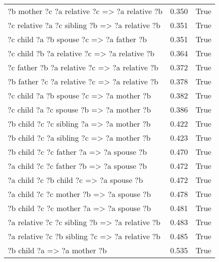 \begin{longtable}{lrl}
  ?b  mother  ?c  ?a  relative  ?c   => ?a  relative  ?b &           0.350 &                     True \\
 ?c  relative  ?a  ?c  sibling  ?b   => ?a  relative  ?b &           0.351 &                     True \\
       ?c  child  ?a  ?b  spouse  ?c   => ?a  father  ?b &           0.351 &                     True \\
   ?c  child  ?b  ?a  relative  ?c   => ?a  relative  ?b &           0.364 &                     True \\
  ?c  father  ?b  ?a  relative  ?c   => ?a  relative  ?b &           0.372 &                     True \\
  ?b  father  ?c  ?a  relative  ?c   => ?a  relative  ?b &           0.378 &                     True \\
       ?c  child  ?a  ?b  spouse  ?c   => ?a  mother  ?b &           0.382 &                     True \\
       ?c  child  ?a  ?c  spouse  ?b   => ?a  mother  ?b &           0.386 &                     True \\
      ?b  child  ?c  ?c  sibling  ?a   => ?a  mother  ?b &           0.422 &                     True \\
      ?b  child  ?c  ?a  sibling  ?c   => ?a  mother  ?b &           0.423 &                     True \\
       ?b  child  ?c  ?c  father  ?a   => ?a  spouse  ?b &           0.470 &                     True \\
       ?a  child  ?c  ?c  father  ?b   => ?a  spouse  ?b &           0.472 &                     True \\
        ?a  child  ?c  ?b  child  ?c   => ?a  spouse  ?b &           0.472 &                     True \\
       ?a  child  ?c  ?c  mother  ?b   => ?a  spouse  ?b &           0.478 &                     True \\
       ?b  child  ?c  ?c  mother  ?a   => ?a  spouse  ?b &           0.481 &                     True \\
 ?a  relative  ?c  ?c  sibling  ?b   => ?a  relative  ?b &           0.483 &                     True \\
 ?a  relative  ?c  ?b  sibling  ?c   => ?a  relative  ?b &           0.485 &                     True \\
                       ?b  child  ?a   => ?a  mother  ?b &           0.535 &                     True \\

\end{longtable}
